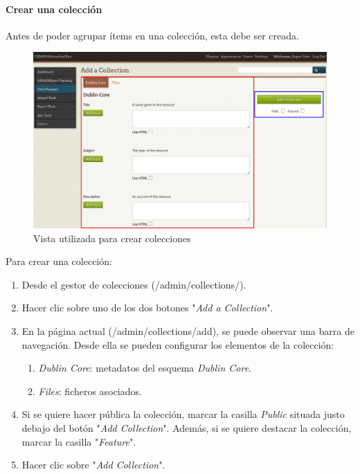 \documentclass[
]{article}
\providecommand{\tightlist}{%
  \setlength{\itemsep}{0pt}\setlength{\parskip}{0pt}}
\begin{document}
\hypertarget{crear-una-colecciuxf3n}{%
\paragraph{Crear una colección}\label{crear-una-colecciuxf3n}}

Antes de poder agrupar ítems en una colección, esta debe ser creada.

\begin{figure}
\hypertarget{add-collections-view}{%
\centering
\includegraphics{../_static/images/add-collections-view.png}
\caption{Vista utilizada para crear
colecciones}\label{add-collections-view}
}
\end{figure}

Para crear una colección:

\begin{enumerate}
\def\labelenumi{\arabic{enumi}.}
\tightlist
\item
  Desde el gestor de colecciones ({/admin/collections/}).
\item
  Hacer clic sobre uno de los dos botones "\emph{Add a Collection}".
\item
  En la página actual ({/admin/collections/add}), se puede observar una
  barra de navegación. Desde ella se pueden configurar los elementos de
  la colección:

  \begin{enumerate}
  \def\labelenumii{\alph{enumii}.}
  \tightlist
  \item
    \emph{Dublin Core}: metadatos del esquema \emph{Dublin Core}.
  \item
    \emph{Files}: ficheros asociados.
  \end{enumerate}
\item
  Si se quiere hacer pública la colección, marcar la casilla
  \emph{Public} situada justo debajo del botón "\emph{Add Collection}".
  Además, si se quiere destacar la colección, marcar la casilla
  "\emph{Feature}".
\item
  Hacer clic sobre "\emph{Add Collection}".
\end{enumerate}
\end{document}
